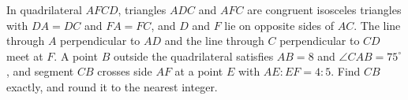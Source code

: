 In quadrilateral $AFCD$, triangles $ADC$ and $AFC$ are congruent isosceles triangles with $DA=DC$ and $FA=FC$, and $D$ and $F$ lie on opposite sides of $AC$. The line through $A$ perpendicular to $AD$ and the line through $C$ perpendicular to $CD$ meet at $F$. A point $B$ outside the quadrilateral satisfies $AB=8$ and $\angle CAB=75^\circ$, and segment $CB$ crosses side $AF$ at a point $E$ with $AE:EF=4:5$. Find $CB$ exactly, and round it to the nearest integer.
